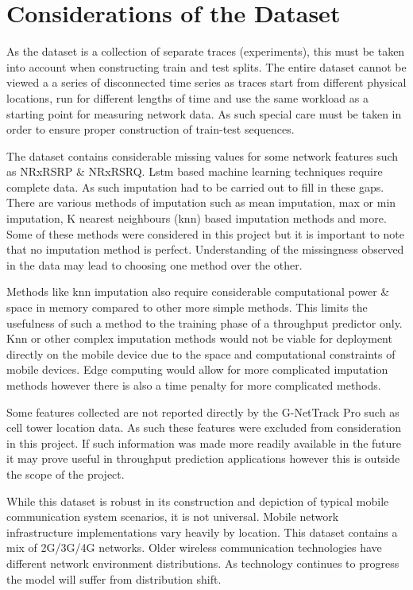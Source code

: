 \section{Considerations of the Dataset}

As the dataset is a collection of separate traces (experiments), this must be taken into account when constructing train and test splits. The entire dataset cannot be viewed a a series of disconnected time series as traces start from different physical locations, run for different lengths of time and use the same workload as a starting point for measuring network data. As such special care must be taken in order to ensure proper construction of train-test sequences.

The dataset contains considerable missing values for some network features such as NRxRSRP \& NRxRSRQ. Lstm based machine learning techniques require complete data. As such imputation had to be carried out to fill in these gaps. There are various methods of imputation such as mean imputation, max or min imputation, K nearest neighbours (knn) based imputation methods and more. Some of these methods were considered in this project but it is important to note that no imputation method is perfect. Understanding of the missingness observed in the data may lead to choosing one method over the other. 

Methods like knn imputation also require considerable computational power \& space in memory compared to other more simple methods. This limits the usefulness of such a method to the training phase of a throughput predictor only. Knn or other complex imputation methods would not be viable for deployment directly on the mobile device due to the space and computational constraints of mobile devices. Edge computing would allow for more complicated imputation methods however there is also a time penalty for more complicated methods.

Some features collected are not reported directly by the G-NetTrack Pro such as cell tower location data. As such these features were excluded from consideration in this project. If such information was made more readily available in the future it may prove useful in throughput prediction applications however this is outside the scope of the project.

While this dataset is robust in its construction and depiction of typical mobile communication system scenarios, it is not universal. Mobile network infrastructure implementations vary heavily by location. This dataset contains a mix of 2G/3G/4G networks. Older wireless communication technologies have different network environment distributions. As technology continues to progress the model will suffer from distribution shift.


